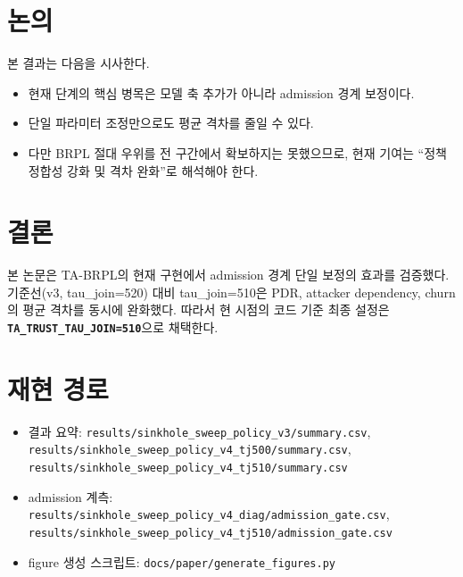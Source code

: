 \documentclass[12pt,a4paper]{article}
\begin{document}
\section{논의}
본 결과는 다음을 시사한다.
\begin{itemize}
  \item 현재 단계의 핵심 병목은 모델 축 추가가 아니라 admission 경계 보정이다.
  \item 단일 파라미터 조정만으로도 평균 격차를 줄일 수 있다.
  \item 다만 BRPL 절대 우위를 전 구간에서 확보하지는 못했으므로,
  현재 기여는 ``정책 정합성 강화 및 격차 완화''로 해석해야 한다.
\end{itemize}

\section{결론}
본 논문은 TA-BRPL의 현재 구현에서 admission 경계 단일 보정의 효과를 검증했다.
기준선(v3, tau\_join=520) 대비 tau\_join=510은
PDR, attacker dependency, churn의 평균 격차를 동시에 완화했다.
따라서 현 시점의 코드 기준 최종 설정은
\textbf{\texttt{TA\_TRUST\_TAU\_JOIN=510}}으로 채택한다.

\section*{재현 경로}
\begin{itemize}
  \item 결과 요약: \texttt{results/sinkhole\_sweep\_policy\_v3/summary.csv},
  \texttt{results/sinkhole\_sweep\_policy\_v4\_tj500/summary.csv},
  \texttt{results/sinkhole\_sweep\_policy\_v4\_tj510/summary.csv}
  \item admission 계측: \texttt{results/sinkhole\_sweep\_policy\_v4\_diag/admission\_gate.csv},
  \texttt{results/sinkhole\_sweep\_policy\_v4\_tj510/admission\_gate.csv}
  \item figure 생성 스크립트: \texttt{docs/paper/generate\_figures.py}
\end{itemize}

\clearpage

\end{document}
